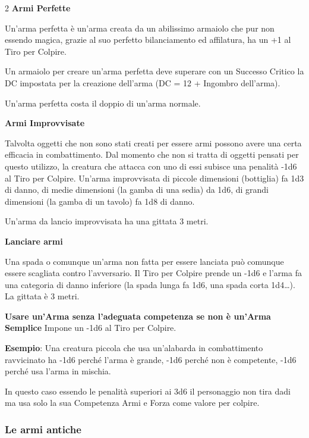 \begin{multicols}{2}
\textbf{Armi Perfette}

Un'arma perfetta è un'arma creata da un abilissimo armaiolo che pur non essendo magica, grazie al suo perfetto bilanciamento ed affilatura, ha un +1 al Tiro per Colpire.

Un armaiolo per creare un'arma perfetta deve superare con un Successo Critico la DC impostata per la creazione dell'arma (DC = 12 + Ingombro dell'arma).

Un'arma perfetta costa il doppio di un'arma normale.

\textbf{Armi Improvvisate}\label{armaimprovvisata}\hypertarget{armaimprovvisata}{}

Talvolta oggetti che non sono stati creati per essere armi possono avere una certa efficacia in combattimento. Dal momento che non si tratta di oggetti pensati per questo utilizzo, la creatura che attacca con uno di essi subisce una penalità -1d6 al Tiro per Colpire. Un'arma improvvisata di piccole dimensioni (bottiglia) fa 1d3 di danno, di medie dimensioni (la gamba di una sedia) da 1d6, di grandi dimensioni (la gamba di un tavolo) fa 1d8 di danno.

Un'arma da lancio improvvisata ha una gittata 3 metri.

\medskip

\textbf{Lanciare armi}

Una spada o comunque un'arma non fatta per essere lanciata può comunque essere scagliata contro l'avversario. Il Tiro per Colpire prende un -1d6 e l'arma fa una categoria di danno inferiore (la spada lunga fa 1d6, una spada corta 1d4…). La gittata è 3 metri.

\medskip

\textbf{Usare un'Arma senza l'adeguata competenza se non è un'Arma Semplice} Impone un -1d6 al Tiro per Colpire.

\textbf{Esempio}: Una creatura piccola che usa un'alabarda in combattimento ravvicinato ha -1d6 perché l'arma è grande, -1d6 perché non è competente, -1d6 perché usa l'arma in mischia.

In questo caso essendo le penalità superiori ai 3d6 il personaggio non tira dadi ma usa solo la sua Competenza Armi e Forza come valore per colpire.

\subsubsection{Le armi antiche}


\end{multicols}
